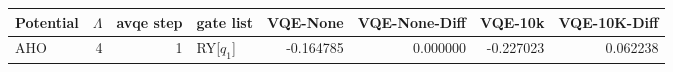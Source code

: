 \begin{tabular}{lrrlrrrr}
\toprule
Potential & $\Lambda$ & avqe step & gate list & VQE-None & VQE-None-Diff & VQE-10k & VQE-10K-Diff \\
\midrule
AHO & 4 & 1 & RY[$q_1$] & -0.164785 & 0.000000 & -0.227023 & 0.062238 \\
\bottomrule
\end{tabular}
